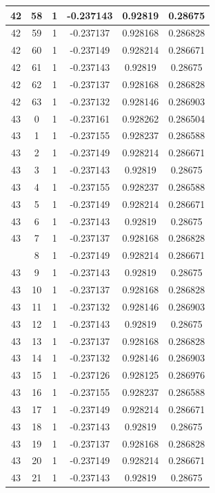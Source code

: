 \documentclass[12pt,a4paper]{article}
\numberwithin{equation}{section}
\numberwithin{figure}{section}
\numberwithin{table}{section}
\begin{document}
\begin{longtable}{|c|c|c|c|c|c|}
42 & 58 & 1 & -0.237143 & 0.92819 & 0.28675 \\ \hline
42 & 59 & 1 & -0.237137 & 0.928168 & 0.286828 \\ \hline
42 & 60 & 1 & -0.237149 & 0.928214 & 0.286671 \\ \hline
42 & 61 & 1 & -0.237143 & 0.92819 & 0.28675 \\ \hline
42 & 62 & 1 & -0.237137 & 0.928168 & 0.286828 \\ \hline
42 & 63 & 1 & -0.237132 & 0.928146 & 0.286903 \\ \hline
43 & 0 & 1 & -0.237161 & 0.928262 & 0.286504 \\ \hline
43 & 1 & 1 & -0.237155 & 0.928237 & 0.286588 \\ \hline
43 & 2 & 1 & -0.237149 & 0.928214 & 0.286671 \\ \hline
43 & 3 & 1 & -0.237143 & 0.92819 & 0.28675 \\ \hline
43 & 4 & 1 & -0.237155 & 0.928237 & 0.286588 \\ \hline
43 & 5 & 1 & -0.237149 & 0.928214 & 0.286671 \\ \hline
43 & 6 & 1 & -0.237143 & 0.92819 & 0.28675 \\ \hline
43 & 7 & 1 & -0.237137 & 0.928168 & 0.286828 \\ \hline
\pagebreak
43 & 8 & 1 & -0.237149 & 0.928214 & 0.286671 \\ \hline
43 & 9 & 1 & -0.237143 & 0.92819 & 0.28675 \\ \hline
43 & 10 & 1 & -0.237137 & 0.928168 & 0.286828 \\ \hline
43 & 11 & 1 & -0.237132 & 0.928146 & 0.286903 \\ \hline
43 & 12 & 1 & -0.237143 & 0.92819 & 0.28675 \\ \hline
43 & 13 & 1 & -0.237137 & 0.928168 & 0.286828 \\ \hline
43 & 14 & 1 & -0.237132 & 0.928146 & 0.286903 \\ \hline
43 & 15 & 1 & -0.237126 & 0.928125 & 0.286976 \\ \hline
43 & 16 & 1 & -0.237155 & 0.928237 & 0.286588 \\ \hline
43 & 17 & 1 & -0.237149 & 0.928214 & 0.286671 \\ \hline
43 & 18 & 1 & -0.237143 & 0.92819 & 0.28675 \\ \hline
43 & 19 & 1 & -0.237137 & 0.928168 & 0.286828 \\ \hline
43 & 20 & 1 & -0.237149 & 0.928214 & 0.286671 \\ \hline
43 & 21 & 1 & -0.237143 & 0.92819 & 0.28675 \\ \hline

\end{longtable}
\end{document}
